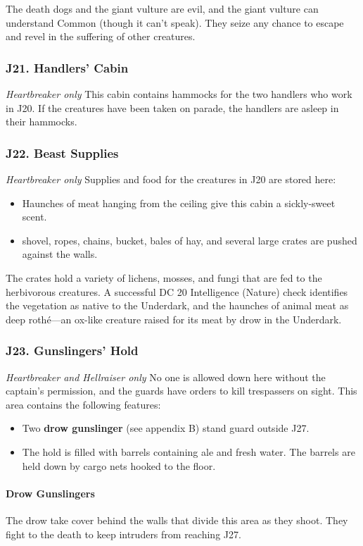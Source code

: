 \documentclass[10pt,a4paper,twoside,twocolumn,openany,nodeprecatedcode]{dndbook}
\begin{document}
The death dogs and the giant vulture are evil, and the giant vulture can understand Common (though it can't speak). They seize any chance to escape and revel in the suffering of other creatures.
\subsubsection{J21. Handlers' Cabin}
\textit{Heartbreaker only}
This cabin contains hammocks for the two handlers who work in J20. If the creatures have been taken on parade, the handlers are asleep in their hammocks.
\subsubsection{J22. Beast Supplies}
\textit{Heartbreaker only}
Supplies and food for the creatures in J20 are stored here:
\begin{itemize}

\item Haunches of meat hanging from the ceiling give this cabin a sickly-sweet scent.
\item shovel, ropes, chains, bucket, bales of hay, and several large crates are pushed against the walls.
\end{itemize}


The crates hold a variety of lichens, mosses, and fungi that are fed to the herbivorous creatures. A successful DC 20 Intelligence (Nature) check identifies the vegetation as native to the Underdark, and the haunches of animal meat as deep rothé—an ox-like creature raised for its meat by drow in the Underdark.
\subsubsection{J23. Gunslingers' Hold}
\textit{Heartbreaker and Hellraiser only}
No one is allowed down here without the captain's permission, and the guards have orders to kill trespassers on sight. This area contains the following features:
\begin{itemize}

\item Two \textbf{drow gunslinger} (see appendix B) stand guard outside J27.
\item The hold is filled with barrels containing ale and fresh water. The barrels are held down by cargo nets hooked to the floor.
\end{itemize}


\paragraph{Drow Gunslingers}
The drow take cover behind the walls that divide this area as they shoot. They fight to the death to keep intruders from reaching J27.
\end{document}
